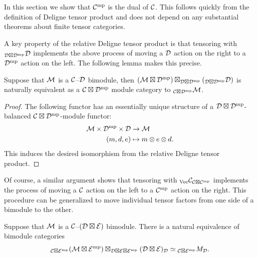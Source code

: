\documentclass{amsart}
\begin{document}
In this section we show that $\mathcal C^{\mathrm{mp}}$ is the dual of $\mathcal C$.  This follows quickly from the definition of Deligne tensor product and does not depend on any substantial theorems about finite tensor categories.

A key property of the relative Deligne tensor product is that tensoring with ${}_{\mathcal D \boxtimes \mathcal D^{\mathrm{mp}}} \mathcal D$ implements the above process of moving a $\mathcal D$ action on the right to a $\mathcal D^{\mathrm{mp}}$ action on the left.  The following lemma makes this precise.

\begin{lemma} \label{lemma-actionswitch}
Suppose that $\mathcal M$ is a $\mathcal C$--$\mathcal D$ bimodule, then $(\mathcal M \boxtimes \mathcal D^{\mathrm{mp}}) \boxtimes_{\mathcal D \boxtimes \mathcal D^{\mathrm{mp}}} ({}_{\mathcal D \boxtimes \mathcal D^{\mathrm{mp}}} \mathcal D)$ is naturally equivalent as a $\mathcal C \boxtimes \mathcal D^{\mathrm{mp}}$ module category to ${}_{\mathcal C \boxtimes \mathcal D^{\mathrm{mp}}}\mathcal M$.
\end{lemma}
\begin{proof}
The following functor has an essentially unique structure of a $\mathcal D \boxtimes \mathcal D^{\mathrm{mp}}$-balanced $\mathcal C \boxtimes \mathcal D^{\mathrm{mp}}$-module functor:
\begin{align*}
	\mathcal M \times \mathcal D^{\mathrm{mp}} \times \mathcal D & \to \mathcal M \\
	(m, d, e) & \mapsto m \otimes e \otimes d.
\end{align*}
This induces the desired isomorphism from the relative Deligne tensor product. 
\end{proof} %

\nid Of course, a similar argument shows that tensoring with ${}_{\mathrm{Vec}} \mathcal C_{\mathcal C \boxtimes \mathcal C^{\mathrm{mp}}}$ implements the process of moving a $\mathcal C$ action on the left to a $\mathcal C^{\mathrm{mp}}$ action on the right. 
This procedure can be generalized to move individual tensor factors from one side of a bimodule to the other.

\begin{lemma} \label{lemma-actionpartialswitch}
Suppose that $\mathcal M$ is a $\mathcal C$--$(\mathcal D \boxtimes \mathcal E)$ bimodule.  There is a natural equivalence of bimodule categories
$${}_{\mathcal C \boxtimes \mathcal E^{\mathrm{mp}}} (\mathcal M \boxtimes \mathcal E^{\mathrm{mp}}) \boxtimes_{\mathcal D \boxtimes \mathcal E \boxtimes \mathcal E^{\mathrm{mp}}} (\mathcal D \boxtimes \mathcal E)_\mathcal D \simeq {}_{\mathcal C \boxtimes \mathcal E^{\mathrm{mp}}}M_\mathcal D.$$
\end{lemma}
\end{document}
